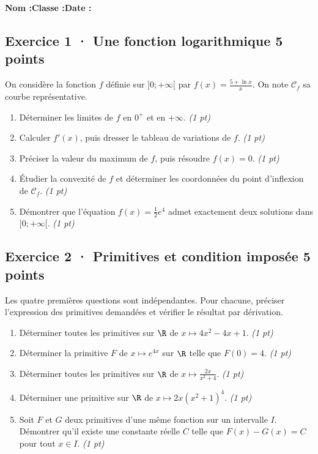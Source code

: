 \smallskip\textbf{Nom :}\enspace\dotfill\quad\textbf{Classe :}\enspace\dotfill\quad\textbf{Date :}\enspace\dotfill

\subsection*{Exercice 1 · Une fonction logarithmique \hfill 5 points}On considère la fonction $f$ définie sur $]0;+\infty[$ par $f(x)=\frac{5+\ln x}x$. On note $\mathcal C_f$ sa courbe représentative.

\begin{enumerate}

\item Déterminer les limites de $f$ en $0^+$ et en $+\infty$. \hfill\textit{(1 pt)}

\item Calculer $f' (x)$, puis dresser le tableau de variations de $f$. \hfill\textit{(1 pt)}

\item Préciser la valeur du maximum de $f$, puis résoudre $f(x)=0$. \hfill\textit{(1 pt)}

\item Étudier la convexité de $f$ et déterminer les coordonnées du point d'inflexion de $\mathcal C_f$. \hfill\textit{(1 pt)}

\item Démontrer que l'équation $f(x)=\frac12 e^{4}$ admet exactement deux solutions dans $]0;+\infty[$. \hfill\textit{(1 pt)}

\end{enumerate}

\subsection*{Exercice 2 · Primitives et condition imposée \hfill 5 points}Les quatre premières questions sont indépendantes. Pour chacune, préciser l'expression des primitives demandées et vérifier le résultat par dérivation.

\begin{enumerate}

\item Déterminer toutes les primitives sur $\R$ de $x\mapsto 4x^2-4x+1$. \hfill\textit{(1 pt)}

\item Déterminer la primitive $F$ de $x\mapsto e^{4x}$ sur $\R$ telle que $F(0)=4$. \hfill\textit{(1 pt)}

\item Déterminer toutes les primitives sur $\R$ de $x\mapsto\frac{2x}{x^2+4}$. \hfill\textit{(1 pt)}

\item Déterminer une primitive sur $\R$ de $x\mapsto2x(x^2+1)^{4}$. \hfill\textit{(1 pt)}

\item Soit $F$ et $G$ deux primitives d'une même fonction sur un intervalle $I$. Démontrer qu'il existe une constante réelle $C$ telle que $F(x)-G(x)=C$ pour tout $x\in I$. \hfill\textit{(1 pt)}

\end{enumerate}

